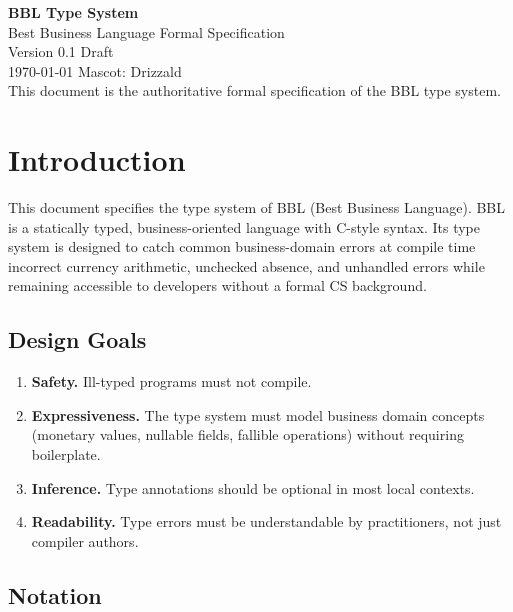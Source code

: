 \documentclass[11pt, letterpaper]{article}
\begin{document}
\begin{titlepage}
  \centering
  \vspace*{2in}
  {\Huge\bfseries\color{bblblue} BBL Type System}\\[0.5em]
  {\large\color{bblgray} Best Business Language  Formal Specification}\\[2em]
  {\normalsize Version 0.1  Draft}\\[0.5em]
  {\normalsize \today}
  \vfill
  {\small\color{bblgray}
    Mascot: Drizzald \\
    This document is the authoritative formal specification of the BBL type system.
  }
\end{titlepage}

\tableofcontents
\newpage

\section{Introduction}

This document specifies the type system of BBL (Best Business Language).
BBL is a statically typed, business-oriented language with C-style syntax.
Its type system is designed to catch common business-domain errors at compile
time  incorrect currency arithmetic, unchecked absence, and unhandled errors 
while remaining accessible to developers without a formal CS background.

\subsection{Design Goals}

\begin{enumerate}[label=\textbf{G\arabic*.}]
  \item \textbf{Safety.} Ill-typed programs must not compile.
  \item \textbf{Expressiveness.} The type system must model business domain
        concepts (monetary values, nullable fields, fallible operations) without
        requiring boilerplate.
  \item \textbf{Inference.} Type annotations should be optional in most
        local contexts.
  \item \textbf{Readability.} Type errors must be understandable by
        practitioners, not just compiler authors.
\end{enumerate}

\subsection{Notation}
\end{document}

